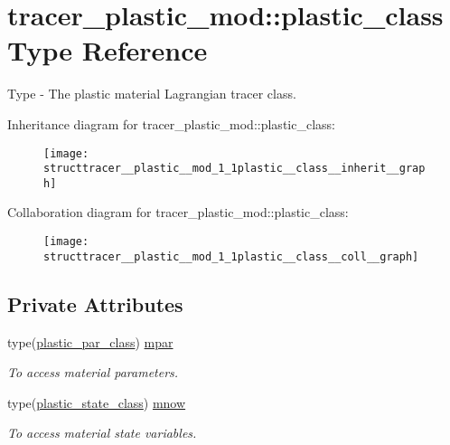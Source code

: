 \hypertarget{structtracer__plastic__mod_1_1plastic__class}{}\section{tracer\+\_\+plastic\+\_\+mod\+:\+:plastic\+\_\+class Type Reference}
\label{structtracer__plastic__mod_1_1plastic__class}


Type -\/ The plastic material Lagrangian tracer class.  




Inheritance diagram for tracer\+\_\+plastic\+\_\+mod\+:\+:plastic\+\_\+class\+:
\nopagebreak
\begin{figure}[H]
\begin{center}
\leavevmode
\texttt{[image: structtracer\_\_plastic\_\_mod\_1\_1plastic\_\_class\_\_inherit\_\_graph]}
\end{center}
\end{figure}


Collaboration diagram for tracer\+\_\+plastic\+\_\+mod\+:\+:plastic\+\_\+class\+:
\nopagebreak
\begin{figure}[H]
\begin{center}
\leavevmode
\texttt{[image: structtracer\_\_plastic\_\_mod\_1\_1plastic\_\_class\_\_coll\_\_graph]}
\end{center}
\end{figure}
\subsection*{Private Attributes}
\begin{DoxyCompactItemize}
\item 
type(\mbox{\hyperlink{structtracer__plastic__mod_1_1plastic__par__class}{plastic\+\_\+par\+\_\+class}}) \mbox{\hyperlink{structtracer__plastic__mod_1_1plastic__class_ae1a94a8bd2796aa13dfa820845f56563}{mpar}}
\begin{DoxyCompactList}\small\item\em To access material parameters. \end{DoxyCompactList}\item 
type(\mbox{\hyperlink{structtracer__plastic__mod_1_1plastic__state__class}{plastic\+\_\+state\+\_\+class}}) \mbox{\hyperlink{structtracer__plastic__mod_1_1plastic__class_ae30b971a131c8203026a7631dff3a51f}{mnow}}
\begin{DoxyCompactList}\small\item\em To access material state variables. \end{DoxyCompactList}\end{DoxyCompactItemize}


